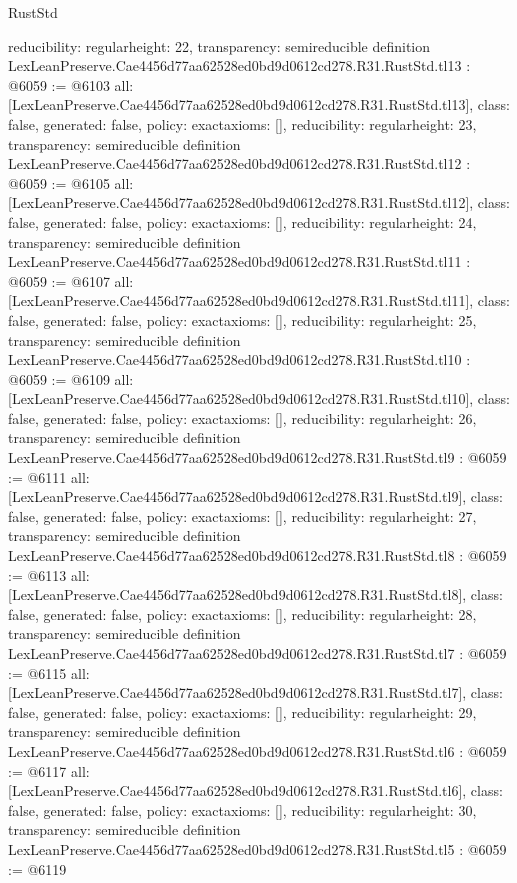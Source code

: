 \begin{lexlean}{RustStd}
\begin{coremodule}
{  reducibility: regular{height: 22},
  transparency: semireducible
}
definition LexLeanPreserve.Cae4456d77aa62528ed0bd9d0612cd278.R31.RustStd.tl13 : @6059 := @6103 {
  all: [LexLeanPreserve.Cae4456d77aa62528ed0bd9d0612cd278.R31.RustStd.tl13],
  class: false,
  generated: false,
  policy: exact{axioms: []},
  reducibility: regular{height: 23},
  transparency: semireducible
}
definition LexLeanPreserve.Cae4456d77aa62528ed0bd9d0612cd278.R31.RustStd.tl12 : @6059 := @6105 {
  all: [LexLeanPreserve.Cae4456d77aa62528ed0bd9d0612cd278.R31.RustStd.tl12],
  class: false,
  generated: false,
  policy: exact{axioms: []},
  reducibility: regular{height: 24},
  transparency: semireducible
}
definition LexLeanPreserve.Cae4456d77aa62528ed0bd9d0612cd278.R31.RustStd.tl11 : @6059 := @6107 {
  all: [LexLeanPreserve.Cae4456d77aa62528ed0bd9d0612cd278.R31.RustStd.tl11],
  class: false,
  generated: false,
  policy: exact{axioms: []},
  reducibility: regular{height: 25},
  transparency: semireducible
}
definition LexLeanPreserve.Cae4456d77aa62528ed0bd9d0612cd278.R31.RustStd.tl10 : @6059 := @6109 {
  all: [LexLeanPreserve.Cae4456d77aa62528ed0bd9d0612cd278.R31.RustStd.tl10],
  class: false,
  generated: false,
  policy: exact{axioms: []},
  reducibility: regular{height: 26},
  transparency: semireducible
}
definition LexLeanPreserve.Cae4456d77aa62528ed0bd9d0612cd278.R31.RustStd.tl9 : @6059 := @6111 {
  all: [LexLeanPreserve.Cae4456d77aa62528ed0bd9d0612cd278.R31.RustStd.tl9],
  class: false,
  generated: false,
  policy: exact{axioms: []},
  reducibility: regular{height: 27},
  transparency: semireducible
}
definition LexLeanPreserve.Cae4456d77aa62528ed0bd9d0612cd278.R31.RustStd.tl8 : @6059 := @6113 {
  all: [LexLeanPreserve.Cae4456d77aa62528ed0bd9d0612cd278.R31.RustStd.tl8],
  class: false,
  generated: false,
  policy: exact{axioms: []},
  reducibility: regular{height: 28},
  transparency: semireducible
}
definition LexLeanPreserve.Cae4456d77aa62528ed0bd9d0612cd278.R31.RustStd.tl7 : @6059 := @6115 {
  all: [LexLeanPreserve.Cae4456d77aa62528ed0bd9d0612cd278.R31.RustStd.tl7],
  class: false,
  generated: false,
  policy: exact{axioms: []},
  reducibility: regular{height: 29},
  transparency: semireducible
}
definition LexLeanPreserve.Cae4456d77aa62528ed0bd9d0612cd278.R31.RustStd.tl6 : @6059 := @6117 {
  all: [LexLeanPreserve.Cae4456d77aa62528ed0bd9d0612cd278.R31.RustStd.tl6],
  class: false,
  generated: false,
  policy: exact{axioms: []},
  reducibility: regular{height: 30},
  transparency: semireducible
}
definition LexLeanPreserve.Cae4456d77aa62528ed0bd9d0612cd278.R31.RustStd.tl5 : @6059 := @6119 {
}
\end{coremodule}
\end{lexlean}
